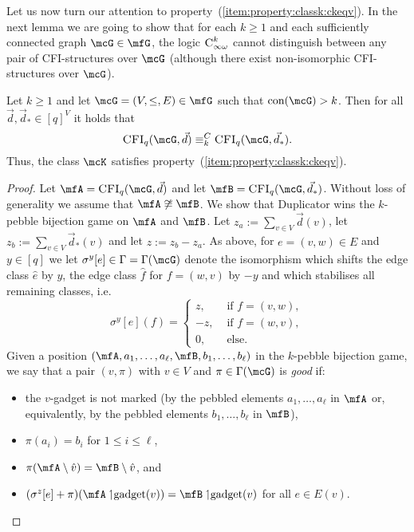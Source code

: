 \documentclass[a4paper,UKenglish]{lipics}
\newcommand{\defeq}{:=}
\newcommand{\nisom}{\not\cong}
\newcommand{\inseg}[1]{\ensuremath{[#1]}}
\newcommand{\con}{\ensuremath{\text{con}}\xspace}
\newcommand{\logic}[1]{\ensuremath{\textsc{#1}}\xspace}
\newcommand{\INFCk}{\ensuremath{\logic{C}^k_{\infty\omega}}\xspace}
\newcommand{\Ckeqv}{\ensuremath{\equiv^C_k}\xspace}
\theoremstyle{plain}
\begin{document}
\medskip
Let us now turn our attention to 
property~(\ref{item:property:classk:ckeqv}).
In the next lemma we are going to show that for each $k \geq 1$ and each
sufficiently connected graph $\mcG \in \mfG$, the logic $\INFCk$ cannot 
distinguish between any pair of CFI-structures over $\mcG$ (although there 
exist non-isomorphic CFI-structures over $\mcG$).
\begin{lemma} \label{lemma:slv:classk:prop:4}
 Let $k \geq 1$ and let $\mcG=(V,\leq,E) \in \mfG$ such that $\con(\mcG) > 
k$.
 Then for all $\vec d, \vec d_* \in {\inseg q}^V$ it holds that
 \[ \CFI(\mcG, \vec d) \Ckeqv \CFI(\mcG, \vec d_*).\]
 Thus, the class $\mcK$ satisfies 
property~(\ref{item:property:classk:ckeqv}).
\end{lemma}
\begin{proof}
 Let $\mfA = \CFI(\mcG, \vec d)$ and let $\mfB = \CFI(\mcG, \vec d_*)$. 
 Without loss of generality we assume that $\mfA \nisom \mfB$.
 We show 
that Duplicator wins the $k$-pebble bijection game 
on $\mfA$ and $\mfB$. Let $z_a \defeq \sum_{v \in V} \vec d(v)$, let $z_b 
\defeq \sum_{v \in V} \vec d_*(v)$ and let $z \defeq z_b - z_a$.
As above, for $e=(v,w) \in E$ and $y \in \inseg q$ we let $\sigma^y[e] \in 
\Gamma = 
\Gamma(\mcG)$ denote the isomorphism which shifts the edge class $\hat e$ by 
$y$, the edge class $\hat f$ for $f = (w,v)$ by $-y$ and which stabilises all 
remaining classes, i.e.\
\[ \sigma^y[e](f) = \begin{cases}
                     z,&\text{ if } f = (v,w),\\
                     -z,&\text{ if } f = (w,v),\\
                     0,&\text{ else.}
                    \end{cases}
\]
Given a position $(\mfA, a_1, \dots, a_\ell, \mfB, b_1, \dots, b_\ell)$ in the 
$k$-pebble bijection game, we say that a pair $(v,\pi)$ with $v\in V$ and $\pi 
\in \Gamma(\mcG)$ is \emph{good} if:
\begin{itemize}
 \item the $v$-gadget is not marked (by the pebbled elements $a_1, \dots, 
a_\ell$ in $\mfA$ or, equivalently, by the pebbled elements $b_1, \dots, 
b_\ell$ in $\mfB$),
 \item $\pi(a_i) = b_i$ for $1 \leq i \leq \ell$, 
 \item $\pi(\mfA \setminus \hat v) = \mfB \setminus \hat v$, and
 \item $(\sigma^z[e]+ \pi)(\mfA \upharpoonleft \gadget(v)) = \mfB 
\upharpoonleft \gadget(v)$ for all $e \in E(v)$.

\end{itemize}
\end{proof}
\end{document}
